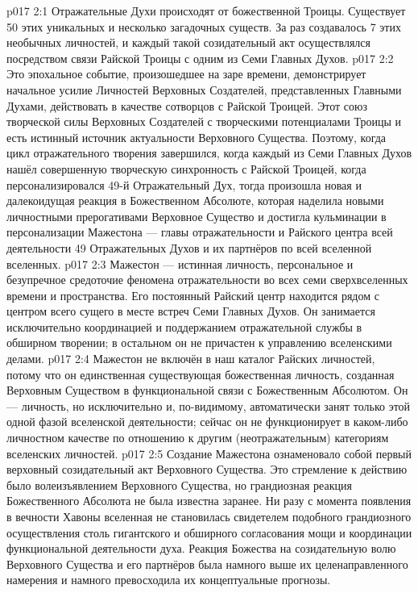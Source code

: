 \vs p017 2:1 Отражательные Духи происходят от божественной Троицы. Существует 50 этих уникальных и несколько загадочных существ. За раз создавалось 7 этих необычных личностей, и каждый такой созидательный акт осуществлялся посредством связи Райской Троицы с одним из Семи Главных Духов.
\vs p017 2:2 Это эпохальное событие, произошедшее на заре времени, демонстрирует начальное усилие Личностей Верховных Создателей, представленных Главными Духами, действовать в качестве сотворцов с Райской Троицей. Этот союз творческой силы Верховных Создателей с творческими потенциалами Троицы и есть истинный источник актуальности Верховного Существа. Поэтому, когда цикл отражательного творения завершился, когда каждый из Семи Главных Духов нашёл совершенную творческую синхронность с Райской Троицей, когда персонализировался 49\hyp{}й Отражательный Дух, тогда произошла новая и далекоидущая реакция в Божественном Абсолюте, которая наделила новыми личностными прерогативами Верховное Существо и достигла кульминации в персонализации Мажестона --- главы отражательности и Райского центра всей деятельности 49 Отражательных Духов и их партнёров по всей вселенной вселенных.
\vs p017 2:3 Мажестон --- истинная личность, персональное и безупречное средоточие феномена отражательности во всех семи сверхвселенных времени и пространства. Его постоянный Райский центр находится рядом с центром всего сущего в месте встреч Семи Главных Духов. Он занимается исключительно координацией и поддержанием отражательной службы в обширном творении; в остальном он не причастен к управлению вселенскими делами.
\vs p017 2:4 Мажестон не включён в наш каталог Райских личностей, потому что он единственная существующая божественная личность, созданная Верховным Существом в функциональной связи с Божественным Абсолютом. Он --- личность, но исключительно и, по\hyp{}видимому, автоматически занят только этой одной фазой вселенской деятельности; сейчас он не функционирует в каком\hyp{}либо личностном качестве по отношению к другим (неотражательным) категориям вселенских личностей.
\vs p017 2:5 \pc Создание Мажестона ознаменовало собой первый верховный созидательный акт Верховного Существа. Это стремление к действию было волеизъявлением Верховного Существа, но грандиозная реакция Божественного Абсолюта не была известна заранее. Ни разу с момента появления в вечности Хавоны вселенная не становилась свидетелем подобного грандиозного осуществления столь гигантского и обширного согласования мощи и координации функциональной деятельности духа. Реакция Божества на созидательную волю Верховного Существа и его партнёров была намного выше их целенаправленного намерения и намного превосходила их концептуальные прогнозы.
